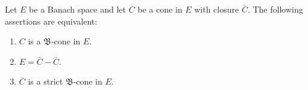 Let $E$ be a Banach space and let $C$ be a cone in $E$ with closure $\bar{C}$. The following assertions are equivalent:
\begin{enumerate}
  \item[(a)] $C$ is a $\mathfrak{B}$-cone in $E$.
  \item[(b)] $E = \bar{C} - \bar{C}$.
  \item[(c)] $\bar{C}$ is a strict $\mathfrak{B}$-cone in $E$.
\end{enumerate}
